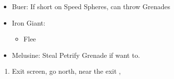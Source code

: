 \begin{encounters}
	\begin{itemize}
		\item Buer: If short on Speed Spheres, can throw Grenades
		\item Iron Giant:
		      \begin{itemize}
			      \switch{\tidus}{\rikku}
			      \rikkuf Steal Light Curtain
			      \switch{\wakka}{\tidus}
			      \tidusf Defend
			      \enemyf Attacks \rikku
			      \auronf Defend
			      \item Flee
		      \end{itemize}
		\item Melusine: Steal Petrify Grenade if want to.
	\end{itemize}
\end{encounters}
\begin{enumerate}[resume]
	\item Exit screen, go north, near the exit \sd, \cs[3:10]
\end{enumerate}